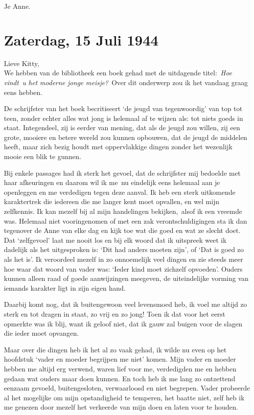 \documentclass{book}
\begin{document}
Je Anne.

\chapter{Zaterdag, 15 Juli 1944}

Lieve Kitty,\\We hebben van de bibliotheek een boek gehad met de
uitdagende titel:~\emph{Hoe vindt~u het moderne jonge meisje?}~Over dit
onderwerp zou ik het vandaag graag eens hebben.

De schrijfster van het boek becritiseert `de jeugd van tegenwoordig' van
top tot teen, zonder echter alles wat jong is helemaal af te wijzen als:
tot niets goeds in staat. Integendeel, zij is eerder van mening, dat als
de jeugd zou willen, zij een grote, mooiere en betere wereld zou kunnen
opbouwen, dat de jeugd de middelen heeft, maar zich bezig houdt met
oppervlakkige dingen zonder het wezenlijk mooie een blik te gunnen.

Bij enkele passages had ik sterk het gevoel, dat de schrijfster mij
bedoelde met haar afkeuringen en daarom wil ik me~nu eindelijk eens
helemaal aan je openleggen en me verdedigen tegen deze aanval. Ik heb
een sterk uitkomende karaktertrek die iedereen die me langer kent moet
opvallen, en wel mijn zelfkennis. Ik kan mezelf bij al mijn handelingen
bekijken,~alsof ik een vreemde was. Helemaal niet vooringenomen of met
een zak verontschuldigingen sta ik dan tegenover de Anne van elke dag en
kijk toe wat die goed en wat ze slecht doet. Dat `zelfgevoel' laat me
nooit los en bij elk woord dat ik uitspreek weet ik dadelijk als het
uitgesproken is: `Dit had anders moeten zijn', of `Dat is goed zo als
het is'. Ik veroordeel mezelf in zo onnoemelijk veel dingen en zie
steeds meer hoe waar dat woord van vader was: `Ieder kind moet zichzelf
opvoeden'. Ouders kunnen alleen raad of goede aanwijzingen meegeven, de
uiteindelijke vorming van iemands karakter ligt in zijn eigen hand.

Daarbij komt nog, dat ik buitengewoon veel levensmoed heb, ik voel me
altijd zo sterk en tot dragen in staat, zo vrij en zo jong! Toen ik dat
voor het eerst opmerkte was ik blij, want ik geloof niet, dat ik gauw
zal buigen voor de slagen die ieder moet opvangen.

Maar over die dingen heb ik het al zo vaak gehad, ik wilde nu even op
het hoofdstuk `vader en moeder begrijpen me niet' komen. Mijn vader en
moeder hebben me altijd erg verwend, waren lief voor me, verdedigden me
en hebben gedaan wat ouders maar doen kunnen. En toch heb ik me lang zo
ontzettend eenzaam gevoeld, buitengesloten, verwaarloosd en niet
begrepen. Vader probeerde al het mogelijke om mijn opstandigheid te
temperen, het baatte niet, zelf heb ik me genezen door mezelf het
verkeerde van mijn doen en laten voor te houden.
\end{document}
